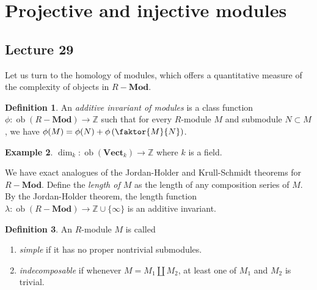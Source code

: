 \documentclass[10pt,letterpaper,cm]{nupset}
\theoremstyle{definition}
\newtheorem{definition}{Definition}[subsection]
\newtheorem{exmp}[definition]{Example}
\theoremstyle{theorem}
\theoremstyle{remark}
\newcommand{\Z}{\mathbb Z}
\newcommand{\1}{\mathbf{1}}
\newcommand{\0}{\vec 0}
\DeclareMathOperator{\ob}{ob}
\begin{document}
\section{Projective and injective modules}

\subsection{Lecture 29}

Let us 
turn to the homology of modules, which offers a quantitative measure of the complexity of objects in $R{-}\mathbf{Mod}$.


\begin{definition}
An \textit{additive invariant of modules} is a class function $\phi : \ob(R{-} \mathbf{Mod}) \to \Z$ such that for every $R$-module $M$ and submodule $N\subset M$, we have $\phi(M) = \phi(N) + \phi \left(\faktor{M}{N} \right)$. 
\end{definition}

\begin{exmp} 
 $\dim_k : \ob(\mathbf{Vect}_k) \to \Z$ where $k$ is a field.
\end{exmp}

\smallskip

We have exact analogues of the Jordan-Holder and Krull-Schmidt theorems for $R{-}\mathbf{Mod}$. Define the \textit{length of $M$} as the length of any composition series of $M$. By the Jordan-Holder theorem, the length function $\lambda : \ob(R{-} \mathbf{Mod}) \to \Z \cup \{\infty\}$ is an additive invariant.



\begin{definition} An $R$-module $M$ is called
\begin{enumerate}
\item \textit{simple} if it has no proper nontrivial submodules.
\item \textit{indecomposable} if whenever $M = M_1 \coprod M_2$, at least one of $M_1$ and $M_2$ is trivial.
\end{enumerate}
\end{definition}
\end{document}
